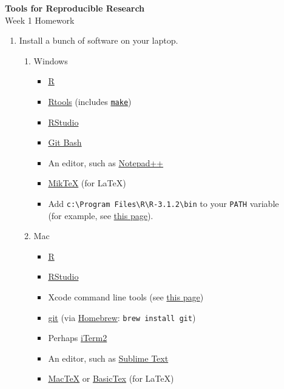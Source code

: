 \documentclass[12pt]{article}
\newcommand{\ttsm}{\tt \small}
\begin{document}
\thispagestyle{empty}

\textbf{Tools for Reproducible Research} \\
Week 1 Homework

\bigskip

\begin{enumerate}
%

\item Install a bunch of software on your laptop.

  \begin{enumerate}
  \item Windows

    \begin{itemize}
    \item \href{http://cran.rstudio.com/bin/windows/base/}{R}
    \item \href{http://cran.rstudio.com/bin/windows/Rtools/Rtools32.exe}{Rtools}
      (includes \href{http://www.gnu.org/software/make/}{\ttsm make})
    \item \href{http://www.rstudio.com/products/rstudio/download/}{RStudio}
    \item \href{http://msysgit.github.io/}{Git Bash}
    \item An editor, such as \href{http://notepad-plus-plus.org/download}{Notepad++}
    \item \href{http://miktex.org/download}{MikTeX} (for LaTeX)
    \item Add {\ttsm c:{\textbackslash}Program Files{\textbackslash}R{\textbackslash}R-3.1.2{\textbackslash}bin}
      to your {\ttsm PATH} variable \\
      (for example, see \href{http://www.howtogeek.com/118594/how-to-edit-your-system-path-for-easy-command-line-access/}{this page}).
    \end{itemize}


  \item Mac

    \begin{itemize}
    \item \href{http://cran.rstudio.com/bin/macosx/}{R}
    \item \href{http://www.rstudio.com/products/rstudio/download}{RStudio}
    \item Xcode command line tools (see
      \href{http://railsapps.github.io/xcode-command-line-tools.html}{this
        page})
    \item \href{http://git-scm.com/download/mac}{git} (via
      \href{http://brew.sh/}{Homebrew}: {\ttsm brew install git})
    \item Perhaps \href{http://iterm2.com/}{iTerm2}
    \item An editor, such as
      \href{http://www.sublimetext.com/}{Sublime Text}
    \item \href{https://tug.org/mactex/}{MacTeX} or
      \href{http://www.tug.org/mactex/morepackages.html}{BasicTex} (for LaTeX)
    \end{itemize}


\end{enumerate}
\end{enumerate}
\end{document}
